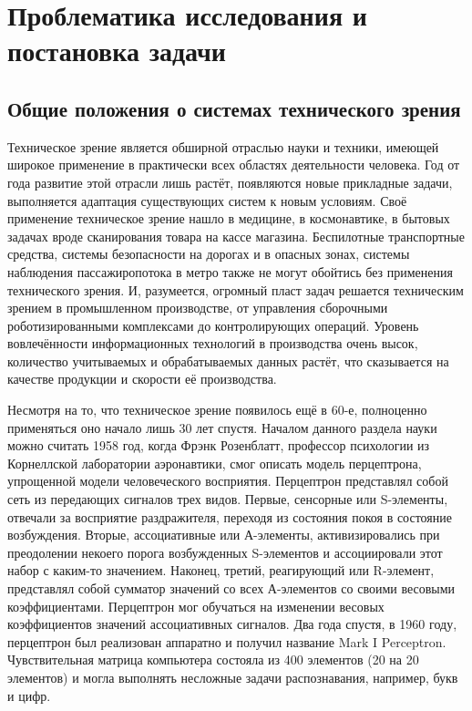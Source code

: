 \chapter{Проблематика исследования и постановка задачи} \label{chapt1}

\section{Общие положения о системах технического зрения} \label{sect1_1}

Техническое зрение является обширной отраслью науки и техники, имеющей широкое применение в практически всех областях деятельности человека. Год от года развитие этой отрасли лишь растёт, появляются новые прикладные задачи, выполняется адаптация существующих систем к новым условиям. Своё применение техническое зрение нашло в медицине, в космонавтике, в бытовых задачах вроде сканирования товара на кассе магазина. Беспилотные транспортные средства, системы безопасности на дорогах и в опасных зонах, системы наблюдения пассажиропотока в метро также не могут обойтись без применения технического зрения. И, разумеется, огромный пласт задач решается техническим зрением в промышленном производстве, от управления сборочными роботизированными комплексами до контролирующих операций. Уровень вовлечённости информационных технологий в производства очень высок, количество учитываемых и обрабатываемых данных растёт, что сказывается на качестве продукции и скорости её производства.

Несмотря на то, что техническое зрение появилось ещё в 60-е, полноценно применяться оно начало лишь 30 лет спустя. Началом данного раздела науки можно считать 1958 год, когда Фрэнк Розенблатт, профессор психологии из Корнеллской лаборатории аэронавтики, смог описать модель перцептрона, упрощенной модели человеческого восприятия. Перцептрон представлял собой сеть из передающих сигналов трех видов. Первые, сенсорные или S-элементы, отвечали за восприятие раздражителя, переходя из состояния покоя в состояние возбуждения. Вторые, ассоциативные или А-элементы, активизировались при преодолении некоего порога возбужденных S-элементов и ассоциировали этот набор с каким-то значением. Наконец, третий, реагирующий или R-элемент, представлял собой сумматор значений со всех А-элементов со своими весовыми коэффициентами. Перцептрон мог обучаться на изменении весовых коэффициентов значений ассоциативных сигналов. Два года спустя, в 1960 году, перцептрон был реализован аппаратно и получил название Mark I Perceptron. Чувствительная матрица компьютера состояла из 400 элементов (20 на 20 элементов) и могла выполнять несложные задачи распознавания, например, букв и цифр.


